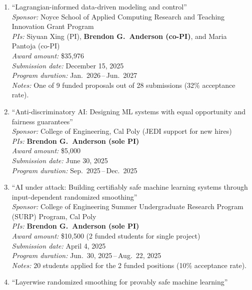 \begin{grants}
\begin{enumerate}[label={\arabic*.}]
	\textit{Submission date:} January 30, 2026 \\
	\textit{Program duration:} Sep.\ 2026\,--\,May 2027 %
	\item ``Lagrangian-informed data-driven modeling and control'' \\
	\textit{Sponsor:} Noyce School of Applied Computing Research and Teaching Innovation Grant Program \\
	\textit{PIs:} Siyuan Xing (PI), \textbf{Brendon G.\ Anderson (co-PI)}, and Maria Pantoja (co-PI) \\
	\textit{Award amount:} \$35,976 \\
	\textit{Submission date:} December 15, 2025 \\
	\textit{Program duration:} Jan.\ 2026\,--\,Jun.\ 2027 \\
	\textit{Notes:} One of 9 funded proposals out of 28 submissions (32\% acceptance rate).
	\item ``Anti-discriminatory AI: Designing ML systems with equal opportunity and fairness guarantees'' \\
	\textit{Sponsor:} College of Engineering, Cal Poly (JEDI support for new hires) \\
	\textit{PIs:} \textbf{Brendon G.\ Anderson (sole PI)} \\
	\textit{Award amount:} \$5,000 \\
	\textit{Submission date:} June 30, 2025 \\
	\textit{Program duration:} Sep.\ 2025\,--\,Dec.\ 2025
	\item ``AI under attack: Building certifiably safe machine learning systems through input-dependent randomized smoothing'' \\
	\textit{Sponsor:} College of Engineering Summer Undergraduate Research Program (SURP) Program, Cal Poly \\
	\textit{PIs:} \textbf{Brendon G.\ Anderson (sole PI)} \\
	\textit{Award amount:} \$10,500 (2 funded students for single project) \\
	\textit{Submission date:} April 4, 2025 \\
	\textit{Program duration:} Jun.\ 30, 2025\,--\,Aug.\ 22, 2025 \\
	\textit{Notes:} 20 students applied for the 2 funded positions (10\% acceptance rate).
	\item ``Layerwise randomized smoothing for provably safe machine learning'' \\

\end{enumerate}
\end{grants}
